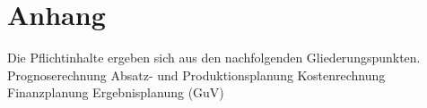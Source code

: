 \documentclass[a4paper, 12pt]{article}
\begin{document}
\section{Anhang}



Die Pflichtinhalte ergeben sich aus den nachfolgenden Gliederungspunkten.
Prognoserechnung
Absatz- und Produktionsplanung
Kostenrechnung
Finanzplanung
Ergebnisplanung (GuV)
\end{document}

